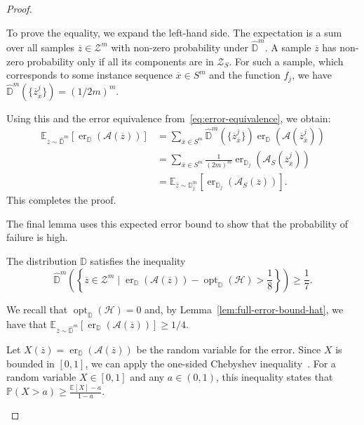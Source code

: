\begin{proof}
\begin{subproof}
        To prove the equality, we expand the left-hand side. The expectation is a sum over all samples $\overline{z} \in \mathcal{Z}^m$ with non-zero probability under $\widehat{\mathbb{D}}^m$. A sample $\overline{z}$ has non-zero probability only if all its components are in $\mathcal{Z}_S$. For such a sample, which corresponds to some instance sequence $\overline{x} \in S^m$ and the function $f_j$, we have $\widehat{\mathbb{D}}^m(\{\overline{z}_{\overline{x}}^j\}) = (1/2m)^m$.

        Using this and the error equivalence from~\eqref{eq:error-equivalence}, we obtain:
        \begin{align*}
            \mathbb{E}_{\overline{z} \sim \widehat{\mathbb{D}}^m} \left[ \operatorname{er}_{\mathbb{D}}(\mathcal{A}(\overline{z})) \right] &= \sum_{\overline{x} \in S^m} \widehat{\mathbb{D}}^m(\{\overline{z}_{\overline{x}}^j\}) \operatorname{er}_{\mathbb{D}}(\mathcal{A}(\overline{z}_{\overline{x}}^j)) \\
            &= \sum_{\overline{x} \in S^m} \frac{1}{(2m)^m} \operatorname{er}_{\mathbb{D}_j}(\mathcal{A}_S(\overline{z}_{\overline{x}}^j)) \\
            &= \mathbb{E}_{\overline{z} \sim \mathbb{D}_j^m} \left[ \operatorname{er}_{\mathbb{D}_j}(\mathcal{A}_S(\overline{z})) \right].
        \end{align*}
        This completes the proof.
    \end{subproof}
    The final lemma uses this expected error bound to show that the probability of failure is high.

    \begin{lemma}
        \label{lem:pac-violation}
        The distribution $\widehat{\mathbb{D}}$ satisfies the inequality
        \[
            \widehat{\mathbb{D}}^m\left(\left\{ \overline{z} \in \mathcal{Z}^m \mid \operatorname{er}_{\mathbb{D}}(\mathcal{A}(\overline{z})) - \operatorname{opt}_{\mathbb{D}}(\mathcal{H}) > \frac{1}{8} \right\}\right) \ge \frac{1}{7}.
        \]
    \end{lemma}
    \begin{subproof}

        We recall that $\operatorname{opt}_{\mathbb{D}}(\mathcal{H}) = 0$ and, by Lemma~\ref{lem:full-error-bound-hat}, we have that $\mathbb{E}_{\overline{z} \sim \widehat{\mathbb{D}}^m} [ \operatorname{er}_{\mathbb{D}}(\mathcal{A}(\overline{z})) ] \ge 1/4$.

        Let $X(\overline{z}) = \operatorname{er}_{\mathbb{D}}(\mathcal{A}(\overline{z}))$ be the random variable for the error. Since $X$ is bounded in $[0,1]$, we can apply the one-sided Chebyshev inequality~\cite[Appendix B.1]{UnderstandinMachineLearning}. For a random variable $X \in [0,1]$ and any $a \in (0,1)$, this inequality states that $\mathbb{P}(X > a) \ge \frac{\mathbb{E}[X] - a}{1-a}$.


\end{subproof}
\end{proof}
